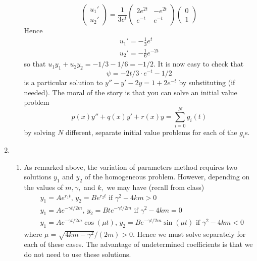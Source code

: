 \documentclass[10pt,a4paper]{letter}
\begin{document}
\begin{enumerate}
\begin{enumerate}
\begin{equation}
\begin{pmatrix}
u_1' \\
u_2'
\end{pmatrix}
= \frac{1}{3 e^{t}}
\begin{pmatrix}
2e^{2t} & -e^{2t} \\
e^{-t} & e^{-t}
\end{pmatrix}\begin{pmatrix}
0 \\
1
\end{pmatrix}
\end{equation}
Hence 
\begin{align*}
u_1' = -\frac{1}{3}e^t \\
u_2' = -\frac{1}{6}e^{-2t}
\end{align*}
so that $u_1 y_1 + u_2 y_2 = -1/3 - 1/6 = -1/2.$ It is now easy to check that 
\[ \psi = -2t/3 \cdot e^{-t} - 1/2 \]
is a particular solution to $y'' - y' - 2y = 1 + 2e^{-t}$ by substituting (if needed). The moral of the story is that you can solve an initial value problem 
\[ p(x)y'' + q(x) y' + r(x) y = \sum_{i=0}^N g_i(t) \] by solving $N$ different, separate initial value problems for each of the $g_i$s.
\end{enumerate}
\item \begin{enumerate}
\item As remarked above, the variation of parameters method requires two solutions $y_1$ and $y_2$ of the homogeneous problem. However, depending on the values of $m, \gamma, $ and $k,$ we may have (recall from class)
\begin{align*}
& y_1 = Ae^{r_1 t}, \, y_2 = Be^{r_2 t} \text{ if } \gamma^2 - 4km > 0 \\
& y_1 = Ae^{-\gamma t/2m}, \, y_2 = Bte^{-\gamma t/2m} \text{ if } \gamma^2 - 4km = 0 \\
& y_1 = Ae^{-\gamma t/2m}\cos(\mu t), \, y_2 = Be^{-\gamma t/2m}\sin(\mu t) \text{ if } \gamma^2 - 4km < 0 
\end{align*}
where $\mu = \sqrt{4km - \gamma^2}/(2m) > 0.$ Hence we must solve separately for each of these cases. The advantage of undetermined coefficients is that we do not need to use these solutions.


\end{enumerate}
\end{enumerate}
\end{document}
